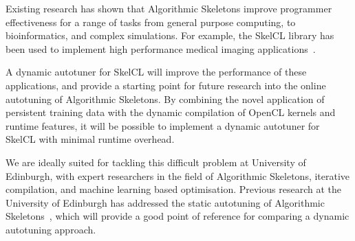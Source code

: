 Existing research has shown that Algorithmic Skeletons improve
programmer effectiveness for a range of tasks from general purpose
computing, to bioinformatics, and complex simulations. For example,
the SkelCL library has been used to implement high performance medical
imaging applications~\cite{Steuwer2012}.

A dynamic autotuner for SkelCL will improve the performance of these
applications, and provide a starting point for future research into
the online autotuning of Algorithmic Skeletons. By combining the novel
application of persistent training data with the dynamic compilation
of OpenCL kernels and runtime features, it will be possible to
implement a dynamic autotuner for SkelCL with minimal runtime
overhead.

We are ideally suited for tackling this difficult problem at
University of Edinburgh, with expert researchers in the field of
Algorithmic Skeletons, iterative compilation, and machine learning
based optimisation. Previous research at the University of Edinburgh
has addressed the static autotuning of Algorithmic
Skeletons~\cite{Collins2012, Collins2013}, which will provide a good
point of reference for comparing a dynamic autotuning approach.
